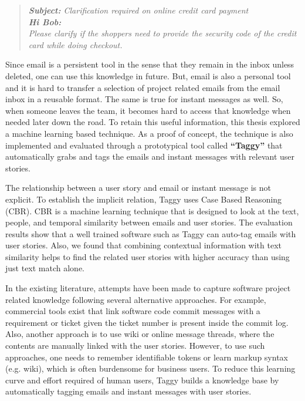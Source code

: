 \begin{quote}
\emph{\textbf{Subject:} Clarification required on online credit card payment\\
\textbf{Hi Bob:}\\
Please clarify if the shoppers need to provide the security code of the credit card while doing checkout.}
\end{quote}

Since email is a persistent tool in the sense that they remain in the inbox unless deleted, one can use this knowledge in future. But, email is also a personal tool and it is hard to transfer a selection of project related emails from the email inbox in a reusable format. The same is true for instant messages as well. So, when someone leaves the team, it becomes hard to access that knowledge when needed later down the road. To retain this useful information, this thesis explored a machine learning based technique. As a proof of concept, the technique is also implemented and evaluated through a prototypical tool called \textbf{``Taggy''} that automatically grabs and tags the emails and instant messages with relevant user stories.

The relationship between a user story and email or instant message is not explicit. To establish the implicit relation, Taggy uses  Case Based Reasoning (CBR). CBR is a machine learning technique that is designed to look at the text, people, and temporal similarity between emails and user stories. The evaluation results show that a well trained software such as Taggy can auto-tag emails with user stories. Also, we found that combining contextual information with text similarity helps to find the related user stories with higher accuracy than using just text match alone.

In the existing literature, attempts have been made to capture software project related knowledge following several alternative approaches. For example, commercial tools exist that link software code commit messages with a requirement or ticket given the ticket number is present inside the commit log. Also, another approach is to use wiki or online message threads, where the contents are manually linked with the user stories. However, to use such approaches, one needs to remember identifiable tokens or learn markup syntax (e.g. wiki), which is often burdensome for business users. To reduce this learning curve and effort required of human users, Taggy builds a knowledge base by automatically tagging emails and instant messages with user stories. 

